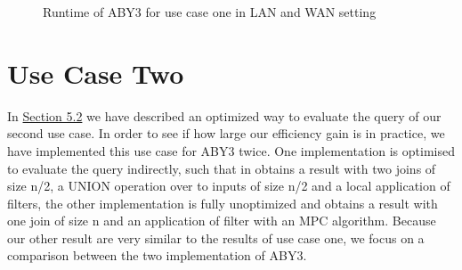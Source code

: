 \begin{figure}[H]
	\caption{Runtime of ABY3 for use case one in LAN and WAN setting}
\end{figure}

\section{Use Case Two} 
In \hyperref[use_case2]{Section 5.2} we have described an optimized way to evaluate the query of our second use case. In order to see if how large our efficiency gain is in practice, we have implemented this use case for ABY3 twice. One implementation is optimised to evaluate the query indirectly, such that in obtains a result with two joins of size n/2, a UNION operation over to inputs of size n/2 and a local application of filters, the other implementation is fully unoptimized and obtains a result with one join of size n and  an application of filter with an MPC algorithm. Because our other result are very similar to the results of use case one, we focus on a comparison between the two implementation of ABY3. 
